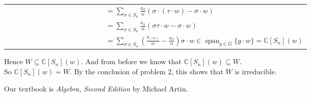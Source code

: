 \documentclass{book}
\newcommand{\exOne}{%
   \color{Purple}%
   \fontsize{13}{15}\selectfont%
}
\newenvironment{myIndent}{%
   \begin{adjustwidth}{2.5em}{0em}%
}{%
   \end{adjustwidth}%
}
\DeclareMathOperator{\Span}{span}
\newcommand{\retTwo}{\hfill\bigbreak}
\begin{document}
\begin{myIndent}
{\begin{tabular}{l}
		$\phantom{v = \sum\limits_{\sigma \in S_n} a_{\sigma}(\sigma \cdot (e_i - e_j))} = \sum\limits_{\sigma \in S_n} \frac{a_{\sigma}}{\alpha}(\sigma \cdot (\tau \cdot w) - \sigma \cdot w)$\\ [14pt]

		$\phantom{v = \sum\limits_{\sigma \in S_n} a_{\sigma}(\sigma \cdot (e_i - e_j))} = \sum\limits_{\sigma \in S_n} \frac{a_{\sigma}}{\alpha}(\sigma\tau \cdot w - \sigma \cdot w)$\\ [14pt]

		$\phantom{v = \sum\limits_{\sigma \in S_n} a_{\sigma}(\sigma \cdot (e_i - e_j))} = \sum\limits_{\sigma \in S_n} \left(\frac{a_{(\sigma\tau)}}{\alpha} - \frac{a_\sigma}{\alpha}\right)\sigma \cdot w \in \Span_{g \in G}\{g \cdot w\} = \mathbb{C}[S_n](w)$
	\end{tabular} \retTwo\par}

	Hence $W \subseteq \mathbb{C}[S_n](w)$. And from before we know that $\mathbb{C}[S_n](w) \subseteq W$.\\ So $\mathbb{C}[S_n](w) = W$. By the conclusion of problem 2, this shows that $W$ is irreducible.






\end{myIndent}



\newpage

\exOne Our textbook is \textit{Algebra, Second Edition} by Michael Artin.
\end{document}
